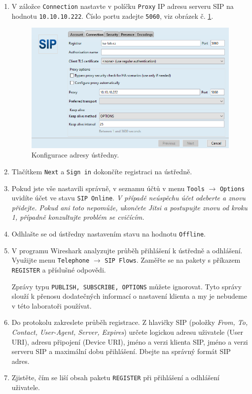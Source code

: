 \documentclass[a4paper,11pt]{article}
\begin{document}
\begin{enumerate}
    \item V záložce {\tt Connection} nastavte v políčku {\tt Proxy} IP adresu serveru SIP na hodnotu {\tt 10.10.10.222}.
      Číslo portu zadejte {\tt 5060}, viz obrázek č. \ref{fig:registration2}. 
      \begin{figure}[h!]
        \centering
        \includegraphics[scale=0.6]{img/jitsi-registration2b.png}
        \caption{Konfigurace adresy ústředny.}
        \label{fig:registration2}
      \end{figure}
    \item Tlačítkem {\tt Next} a {\tt Sign in} dokončíte registraci na ústředně.
    \item  Pokud jste vše nastavili správně, v seznamu účtů v menu {\tt Tools} $\rightarrow$ {\tt Options} uvidíte účet ve stavu {\tt SIP Online}. {\it V případě neúspěchu účet odeberte a znovu přidejte. Pokud ani toto nepomůže, ukončete Jitsi a postupujte znovu od kroku 1, případně konzultujte problém se cvičícím.}
    \item Odhlašte se od ústředny nastavením stavu na hodnotu {\tt Offline}. 
    \item V programu Wireshark analyzujte průběh přihlášení k ústředně a odhlášení. Využijte menu {\tt Telephone} $\rightarrow$ {\tt SIP Flows}. Zaměřte se na pakety s příkazem {\tt REGISTER} a příslušné odpovědi.

      {\small Zprávy typu {\tt PUBLISH, SUBSCRIBE, OPTIONS} můžete ignorovat. Tyto správy slouží k přenosu dodatečných informací o nastavení klienta a my je nebudeme v této laboratoři používat.}
    \item Do protokolu zakreslete průběh registrace. Z hlavičky SIP (položky {\em From, To, Contact, User-Agent, Server, Expires}) určete logickou adresu uživatele (User URI), adresu připojení (Device URI), jméno a verzi klienta SIP, jméno a verzi serveru SIP a maximální dobu přihlášení. Dbejte na správný formát SIP adres.
    \item Zjistěte, čím se liší obsah paketu {\tt REGISTER} při přihlášení a odhlášení uživatele.
\end{enumerate}
\end{document}
